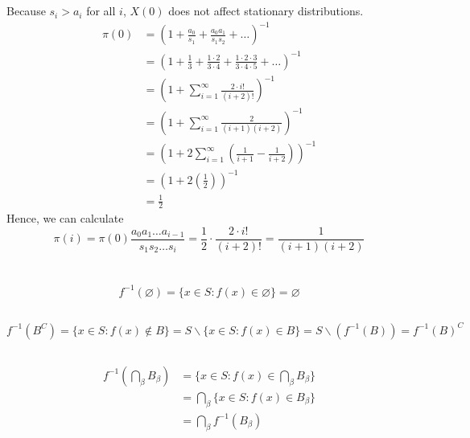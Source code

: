 \documentclass[11pt]{report}
\begin{document}
\section{}
Because $s_i > a_i$ for all $i$, $X(0)$ does not affect stationary distributions.
\begin{equation*}
    \begin{aligned}
        \pi(0) &= \left(1 + \frac{a_0}{s_1} + \frac{a_0 a_1}{s_1 s_2} + \hdots \right)^{-1} \\
        &= \left(1 + \frac{1}{3} + \frac{1 \cdot 2}{3 \cdot 4} + \frac{1 \cdot 2 \cdot 3}{3 \cdot 4 \cdot 5} + \hdots\right)^{-1} \\
        &= \left(1 + \sum_{i=1}^\infty \frac{2 \cdot i!}{(i+2)!} \right)^{-1} \\
        &= \left(1 + \sum_{i=1}^\infty \frac{2}{(i+1)(i+2)} \right)^{-1} \\
        &= \left(1 + 2 \sum_{i=1}^\infty \left(\frac{1}{i+1} - \frac{1}{i+2} \right)\right)^{-1} \\
        &= \left(1 + 2 \left(\frac{1}{2}\right) \right)^{-1} \\
        &= \frac{1}{2}
    \end{aligned}
\end{equation*}
Hence, we can calculate 
\[
    \pi(i) = \pi(0) \frac{a_0 a_1 \hdots a_{i-1}}{s_1 s_2 \hdots s_i} = \frac{1}{2} \cdot \frac{2 \cdot i!}{(i+2)!} = \frac{1}{(i+1)(i+2)}
\]
\newpage
\section{}
\subsection{}
\[
    f^{-1}(\varnothing) = \{x\in S: f(x) \in \varnothing\} = \varnothing
\]
\subsection{}
\[
    f^{-1}(B^C) = \{x\in S: f(x) \notin B\} = S \backslash \{x\in S: f(x) \in B\} = S \backslash (f^{-1}(B)) = f^{-1}(B)^C
\]
\subsection{}
\begin{equation*}
    \begin{aligned}
        f^{-1} \left(\bigcap_\beta B_\beta \right) &= \{x \in S: f(x) \in \bigcap_\beta B_\beta \} \\
        &= \bigcap_\beta \{x \in S: f(x) \in B_\beta\} \\
        &= \bigcap_\beta f^{-1}(B_\beta)
    \end{aligned}
\end{equation*}
\end{document}
